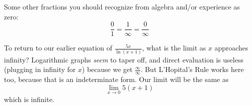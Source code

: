 Some other fractions you should recognize from algebra and/or experience as zero:
$$
\frac{0}{1} = \frac{1}{\infty} = \frac{0}{\infty}
$$

To return to our earlier equation of $\frac{5x}{\ln(x+1)}$, what is the limit as $x$ 
approaches infinity?  Logarithmic graphs \emph{seem} to taper off, and direct 
evaluation is useless (plugging in infinity for $x$) because we get $\frac{\infty}{\infty}$.
But L'Hopital's Rule works here too, because that is an indeterminate form.
Our limit will be the same as 
\begin{equation}
\lim_{x\rightarrow0}5(x+1)
\end{equation}
which is infinite.